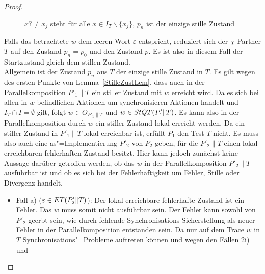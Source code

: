 \begin{proof}
\begin{figure} [h!tbp]
\begin{center}
    \caption{$x?\neq x_j$ steht für alle $x\in I_T\backslash\{x_j\}$, $p_n$
      ist der einzige stille Zustand}
    \label{TohneEmitIundO}
  \end{center}
  \end{figure}
  Falls das betrachtete $w$ dem leeren Wort $\varepsilon$ entspricht, reduziert
  sich der $\chi$-Partner $T$ auf den Zustand $p_n = p_0$ und den Zustand $p$.
  Es ist also in diesem Fall der Startzustand gleich dem stillen Zustand.\\
  Allgemein ist der Zustand $p_n$ aus $T$ der einzige stille Zustand in $T$. Es
  gilt wegen des ersten Punkte von Lemma~\ref{StilleZustLem}, dass auch in der
  Parallelkomposition $P'_1\|T$ ein stiller Zustand mit $w$ erreicht wird. Da
  es sich bei allen in $w$ befindlichen Aktionen um synchronisieren Aktionen
  handelt und $I_T\cap I=\emptyset$ gilt, folgt $w\in O_{P'_1\|T}$ und $w\in
  StQT (P'_1\|T)$. Es kann also in der Parallelkomposition durch $w$ ein
  stiller Zustand lokal erreicht werden. Da ein stiller Zustand in $P'_1\|T$
  lokal erreichbar ist, erfüllt $P_1$ den Test $T$ nicht. Es muss also auch
  eine as"=Implementierung $P'_2$ von $P_2$ geben, für die $P'_2\|T$ einen
  lokal erreichbaren fehlerhaften Zustand besitzt. Hier kann jedoch zunächst
  keine Aussage darüber getroffen werden, ob das $w$ in der Parallelkomposition
  $P'_2\|T$ ausführbar ist und ob es sich bei der Fehlerhaftigkeit um Fehler,
  Stille oder Divergenz handelt.
  \begin{itemize}
    \item Fall a) ($\varepsilon \in ET (P'_2\|T)$): Der lokal erreichbare
      fehlerhafte Zustand ist ein Fehler. Das $w$ muss somit nicht ausführbar
      sein. Der Fehler kann sowohl von $P'_2$ geerbt sein, wie durch fehlende
      Synchronisations-Sicherstellung als neuer Fehler in der
      Parallelkomposition entstanden sein. Da nur auf dem Trace $w$ in $T$
      Synchronisations"=Probleme auftreten können und wegen den Fällen 2i) und

\end{itemize}
\end{proof}
